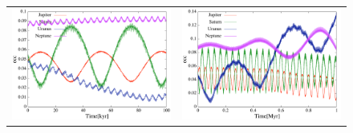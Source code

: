 \documentclass[11pt,a4paper,oneside,onecolumn]{jarticle}
\begin{document}
\begin{figure}[H]
\begin{tabular}{cc}
\begin{minipage}[t]{0.45\hsize}
\centering
\includegraphics[width=7.6cm]{./image/Nomove_ecc_100kyr.pdf}
\end{minipage} &
\begin{minipage}[t]{0.45\hsize}
\centering
\includegraphics[width=7.6cm]{./image/Nomove_ecc_1Myr.pdf}
\end{minipage}
%
\end{tabular}
\caption{\label{}}
\end{figure}
\end{document}
